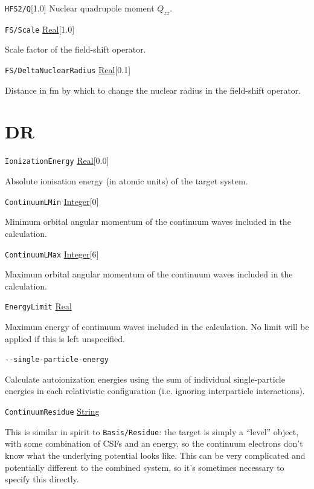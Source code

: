 \documentclass{report}
\begin{document}
\texttt{HFS2/Q}[1.0]
Nuclear quadrupole moment $Q_{zz}$.

\texttt{FS/Scale} \uline{Real}[1.0]
\begin{adjustwidth}{1cm}{}
Scale factor of the field-shift operator.
\end{adjustwidth}

\texttt{FS/DeltaNuclearRadius} \uline{Real}[0.1]
\begin{adjustwidth}{1cm}{}
Distance in fm by which to change the nuclear radius in the field-shift operator. 
\end{adjustwidth}

\section{DR} %

\texttt{IonizationEnergy} \uline{Real}[0.0]
\begin{adjustwidth}{1cm}{}
Absolute ionisation energy (in atomic units) of the target system.
\end{adjustwidth}

\texttt{ContinuumLMin} \uline{Integer}[0]
\begin{adjustwidth}{1cm}{}
Minimum orbital angular momentum of the continuum waves included in the calculation. 
\end{adjustwidth}

\texttt{ContinuumLMax} \uline{Integer}[6]
\begin{adjustwidth}{1cm}{}
Maximum orbital angular momentum of the continuum waves included in the calculation. 
\end{adjustwidth}

\texttt{EnergyLimit} \uline{Real}
\begin{adjustwidth}{1cm}{}
Maximum energy of continuum waves included in the calculation. No limit will be applied if this is left
unspecified.
\end{adjustwidth}

\texttt{{-}{-}single-particle-energy}
\begin{adjustwidth}{1cm}{}
Calculate autoionization energies using the sum of individual single-particle energies in each
relativistic configuration (i.e. ignoring interparticle interactions).
\end{adjustwidth}

\texttt{ContinuumResidue} \uline{String}
\begin{adjustwidth}{1cm}{}
This is similar in spirit to \texttt{Basis/Residue}: the target 
is simply a ``level'' object, with some combination of CSFs and an energy, so the continuum electrons 
don't know what the underlying potential looks like. This can be very complicated and potentially 
different to the combined system, so it's sometimes necessary to specify this directly.
\end{adjustwidth}
\end{document}
